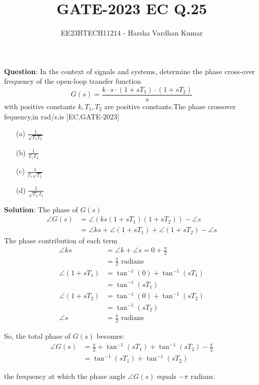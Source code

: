 \documentclass[journal,12pt,twocolumn]{IEEEtran}
\title{GATE-2023 EC Q.25}
\author{EE23BTECH11214 - Harsha Vardhan Kumar}
\begin{document}
\maketitle

\textbf{Question}:
In the context of signals and systems, determine the phase cross-over frequency of the open-loop transfer function
\[
G(s) = \frac{k \cdot s \cdot (1+sT_1) \cdot (1+sT_2)}{s}
\]
with positive constants $k, T_1, T_2$ are positive constants.The phase crossover fequency,in rad/s,is
\hfill [EC,GATE-$2023$]
\begin{enumerate}
  \item[(a)] $\frac{1}{\sqrt{T_1 T_2}}$
  \item[(b)] $\frac{1}{T_1 T_2}$
  \item[(c)] $\frac{1}{T_1\sqrt{T_2}}$
  \item[(d)] $\frac{1}{\sqrt{T_2}T_1}$
\end{enumerate}
\textbf{Solution}:
\fi
The phase of \( G(s) \)
\begin{align}
\angle G(s) &= \angle (ks(1+sT_1)(1+sT_2)) - \angle s \\
&= \angle ks + \angle (1+sT_1) + \angle (1+sT_2) - \angle s 
\end{align}
The phase contribution of each term
\begin{align}
\angle ks &= \angle k + \angle s = 0 + \frac{\pi}{2} \\
&= \frac{\pi}{2} \text{ radians} \\
\angle (1+sT_1) &= \tan^{-1}(0) + \tan^{-1}(sT_1) \\
&= \tan^{-1}(sT_1)  \\
\angle (1+sT_2) &= \tan^{-1}(0) + \tan^{-1}(sT_2)\\ 
&= \tan^{-1}(sT_2)  \\
\angle s &= \frac{\pi}{2} \text{ radians} 
\end{align}

So, the total phase of \( G(s) \) becomes:
\begin{align}
\angle G(s) &= \frac{\pi}{2} + \tan^{-1}(sT_1) + \tan^{-1}(sT_2) - \frac{\pi}{2}  \\
&= \tan^{-1}(sT_1) + \tan^{-1}(sT_2)
\end{align}

the frequency at which the phase angle \( \angle G(s) \) equals \( -\pi \) radians.
\end{document}
